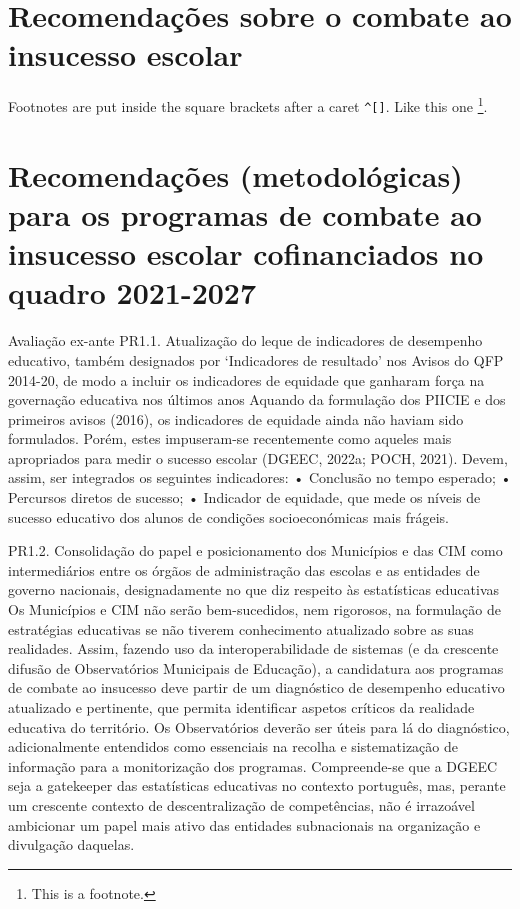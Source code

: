 \documentclass[
]{book}
\begin{document}
\hypertarget{recomendauxe7uxf5es-sobre-o-combate-ao-insucesso-escolar}{%
\section{Recomendações sobre o combate ao insucesso escolar}\label{recomendauxe7uxf5es-sobre-o-combate-ao-insucesso-escolar}}

Footnotes are put inside the square brackets after a caret \texttt{\^{}{[}{]}}. Like this one \footnote{This is a footnote.}.

\hypertarget{recomendauxe7uxf5es-metodoluxf3gicas-para-os-programas-de-combate-ao-insucesso-escolar-cofinanciados-no-quadro-2021-2027}{%
\section{Recomendações (metodológicas) para os programas de combate ao insucesso escolar cofinanciados no quadro 2021-2027}\label{recomendauxe7uxf5es-metodoluxf3gicas-para-os-programas-de-combate-ao-insucesso-escolar-cofinanciados-no-quadro-2021-2027}}

Avaliação ex-ante
PR1.1. Atualização do leque de indicadores de desempenho educativo, também designados por `Indicadores de resultado' nos Avisos do QFP 2014-20, de modo a incluir os indicadores de equidade que ganharam força na governação educativa nos últimos anos
Aquando da formulação dos PIICIE e dos primeiros avisos (2016), os indicadores de equidade ainda não haviam sido formulados. Porém, estes impuseram-se recentemente como aqueles mais apropriados para medir o sucesso escolar (DGEEC, 2022a; POCH, 2021). Devem, assim, ser integrados os seguintes indicadores:
• Conclusão no tempo esperado;
• Percursos diretos de sucesso;
• Indicador de equidade, que mede os níveis de sucesso educativo dos alunos de condições socioeconómicas mais frágeis.

PR1.2. Consolidação do papel e posicionamento dos Municípios e das CIM como intermediários entre os órgãos de administração das escolas e as entidades de governo nacionais, designadamente no que diz respeito às estatísticas educativas
Os Municípios e CIM não serão bem-sucedidos, nem rigorosos, na formulação de estratégias educativas se não tiverem conhecimento atualizado sobre as suas realidades. Assim, fazendo uso da interoperabilidade de sistemas (e da crescente difusão de Observatórios Municipais de Educação), a candidatura aos programas de combate ao insucesso deve partir de um diagnóstico de desempenho educativo atualizado e pertinente, que permita identificar aspetos críticos da realidade educativa do território. Os Observatórios deverão ser úteis para lá do diagnóstico, adicionalmente entendidos como essenciais na recolha e sistematização de informação para a monitorização dos programas.
Compreende-se que a DGEEC seja a gatekeeper das estatísticas educativas no contexto português, mas, perante um crescente contexto de descentralização de competências, não é irrazoável ambicionar um papel mais ativo das entidades subnacionais na organização e divulgação daquelas.
\end{document}
